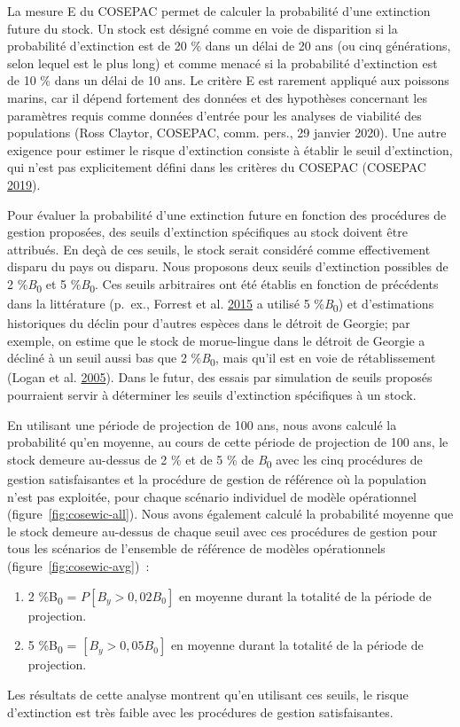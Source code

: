 \documentclass[french,11pt]{book}
\begin{document}
La mesure E du COSEPAC permet de calculer la probabilité d'une extinction future du stock. Un stock est désigné comme en voie de disparition si la probabilité d'extinction est de 20 \% dans un délai de 20 ans (ou cinq générations, selon lequel est le plus long) et comme menacé si la probabilité d'extinction est de 10 \% dans un délai de 10 ans. Le critère E est rarement appliqué aux poissons marins, car il dépend fortement des données et des hypothèses concernant les paramètres requis comme données d'entrée pour les analyses de viabilité des populations (Ross Claytor, COSEPAC, comm. pers., 29 janvier 2020). Une autre exigence pour estimer le risque d'extinction consiste à établir le seuil d'extinction, qui n'est pas explicitement défini dans les critères du COSEPAC (COSEPAC \protect\hyperlink{ref-cosewic2015}{2019}).

Pour évaluer la probabilité d'une extinction future en fonction des procédures de gestion proposées, des seuils d'extinction spécifiques au stock doivent être attribués. En deçà de ces seuils, le stock serait considéré comme effectivement disparu du pays ou disparu. Nous proposons deux seuils d'extinction possibles de 2 \%\emph{B}\textsubscript{0} et 5 \%\emph{B}\textsubscript{0}. Ces seuils arbitraires ont été établis en fonction de précédents dans la littérature (p.~ex., Forrest et al. \protect\hyperlink{ref-forrest2015}{2015} a utilisé 5 \%\emph{B}\textsubscript{0}) et d'estimations historiques du déclin pour d'autres espèces dans le détroit de Georgie; par exemple, on estime que le stock de morue-lingue dans le détroit de Georgie a décliné à un seuil aussi bas que 2 \%\emph{B}\textsubscript{0}, mais qu'il est en voie de rétablissement (Logan et al. \protect\hyperlink{ref-logan2005}{2005}). Dans le futur, des essais par simulation de seuils proposés pourraient servir à déterminer les seuils d'extinction spécifiques à un stock.

En utilisant une période de projection de 100 ans, nous avons calculé la probabilité qu'en moyenne, au cours de cette période de projection de 100 ans, le stock demeure au-dessus de 2 \% et de 5 \% de \emph{B}\textsubscript{0} avec les cinq procédures de gestion satisfaisantes et la procédure de gestion de référence où la population n'est pas exploitée, pour chaque scénario individuel de modèle opérationnel (figure~\ref{fig:cosewic-all}). Nous avons également calculé la probabilité moyenne que le stock demeure au-dessus de chaque seuil avec ces procédures de gestion pour tous les scénarios de l'ensemble de référence de modèles opérationnels (figure~\ref{fig:cosewic-avg})~:
\begin{enumerate}
\def\labelenumi{\arabic{enumi}.}

\item
  2 \%B\textsubscript{0} = \(P[B_y > 0,02 B_0]\) en moyenne durant la totalité de la période de projection.
\item
  5 \%B\textsubscript{0} = \([B_y > 0,05 B_0]\) en moyenne durant la totalité de la période de projection.
\end{enumerate}
Les résultats de cette analyse montrent qu'en utilisant ces seuils, le risque d'extinction est très faible avec les procédures de gestion satisfaisantes.
\end{document}
